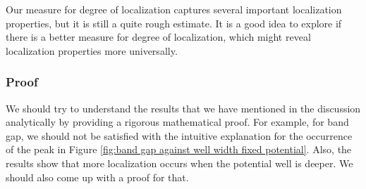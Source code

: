 Our measure for degree of localization captures several important localization properties, but it is still a quite rough estimate. It is a good idea to explore if there is a better measure for degree of localization, which might reveal localization properties more universally. 

\subsubsection{Proof}

We should try to understand the results that we have mentioned in the discussion analytically by providing a rigorous mathematical proof. For example, for band gap, we should not be satisfied with the intuitive explanation for the occurrence of the peak in Figure \ref{fig:band gap against well width fixed potential}. Also, the results show that more localization occurs when the potential well is deeper. We should also come up with a proof for that. 

\endinput
